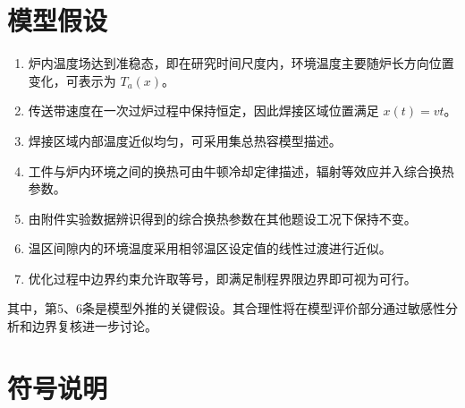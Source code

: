 \documentclass{cumcmthesis}
\begin{document}
\section{模型假设}

\begin{enumerate}
    \item 炉内温度场达到准稳态，即在研究时间尺度内，环境温度主要随炉长方向位置变化，可表示为 $T_a(x)$。
    \item 传送带速度在一次过炉过程中保持恒定，因此焊接区域位置满足 $x(t)=vt$。
    \item 焊接区域内部温度近似均匀，可采用集总热容模型描述。
    \item 工件与炉内环境之间的换热可由牛顿冷却定律描述，辐射等效应并入综合换热参数。
    \item 由附件实验数据辨识得到的综合换热参数在其他题设工况下保持不变。
    \item 温区间隙内的环境温度采用相邻温区设定值的线性过渡进行近似。
    \item 优化过程中边界约束允许取等号，即满足制程界限边界即可视为可行。
\end{enumerate}

其中，第5、6条是模型外推的关键假设。其合理性将在模型评价部分通过敏感性分析和边界复核进一步讨论。

\section{符号说明}
\end{document}
